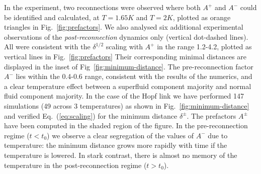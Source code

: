 \documentclass[9pt,twocolumn,twoside]{pnas-new}
\def\red#1{\textcolor{red}{#1}}
\begin{document}
In the experiment, two reconnections were observed where both $A^+$ and $A^-$ could be identified and calculated, at $T=1.65K$ and $T=2K$, plotted as orange triangles in Fig.~\ref{fig:prefactors}. We also analysed six additional experimental observations of the \emph{post-reconnection} dynamics only (vertical dot-dashed lines). All were consistent with the $\delta^{1/2}$ scaling with $A^+$ in the range 1.2-4.2, plotted as vertical lines in Fig.~\ref{fig:prefactors} Their corresponding minimal distances are displayed in the inset of Fig~\ref{fig:minimum-distance}.
%
The pre-reconnection factor $A^-$ lies within the 0.4-0.6 range, consistent with the results of the numerics, and a clear temperature effect between a superfluid component majority and normal fluid component majority.
In the case of the Hopf link 
we have performed 147 simulations 
(49 across 3 temperatures) as shown in Fig.~\ref{fig:minimum-distance} and
verified Eq.~(\ref{eq:scaling}) for the minimum distance $\delta^{\pm}$. 
The prefactors $A^{\pm}$ have been computed in the shaded region 
of the figure. In the pre-reconnection regime ($t<t_0$) we observe
a clear segregation of the values of $A^-$ due to temperature: 
the minimum distance grows more rapidly with time if the temperature is
lowered. 
In stark contrast, there is almost no memory of the temperature in the
post-reconnection regime ($t>t_0$). 
\end{document}
